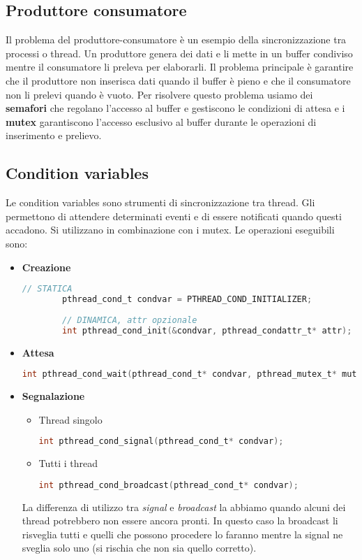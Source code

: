 \subsection{Produttore consumatore}
Il problema del produttore-consumatore è un esempio della sincronizzazione tra processi o thread. Un produttore genera dei dati e li mette in un buffer condiviso mentre il consumatore li preleva per elaborarli. Il problema principale è garantire che il produttore non inserisca dati quando il buffer è pieno e che il consumatore non li prelevi quando è vuoto. Per risolvere questo problema usiamo dei \textbf{semafori} che regolano l'accesso al buffer e gestiscono le condizioni di attesa e i \textbf{mutex} garantiscono l'accesso esclusivo al buffer durante le operazioni di inserimento e prelievo.

\subsection{Condition variables}
Le condition variables sono strumenti di sincronizzazione tra thread. Gli permettono di attendere determinati eventi e di essere notificati quando questi accadono. Si utilizzano in combinazione con i mutex. Le operazioni eseguibili sono:
\begin{itemize}
	\item \textbf{Creazione}
	\begin{lstlisting}[language=C]
		// STATICA
		pthread_cond_t condvar = PTHREAD_COND_INITIALIZER;
		
		// DINAMICA, attr opzionale
		int pthread_cond_init(&condvar, pthread_condattr_t* attr);
	\end{lstlisting}
	\item \textbf{Attesa}
	\begin{lstlisting}[language=C]
		int pthread_cond_wait(pthread_cond_t* condvar, pthread_mutex_t* mutex);
	\end{lstlisting}
	\item \textbf{Segnalazione}
	\begin{itemize}
		\item Thread singolo
		\begin{lstlisting}[language=C]
			int pthread_cond_signal(pthread_cond_t* condvar);
		\end{lstlisting}
		\item Tutti i thread
		\begin{lstlisting}[language=C]
			int pthread_cond_broadcast(pthread_cond_t* condvar);
		\end{lstlisting}
	\end{itemize}
	\begin{note}
		La differenza di utilizzo tra \textit{signal} e \textit{broadcast} la abbiamo quando alcuni dei thread potrebbero non essere ancora pronti. In questo caso la broadcast li risveglia tutti e quelli che possono procedere lo faranno mentre la signal ne sveglia solo uno (si rischia che non sia quello corretto).
	\end{note}
\end{itemize}